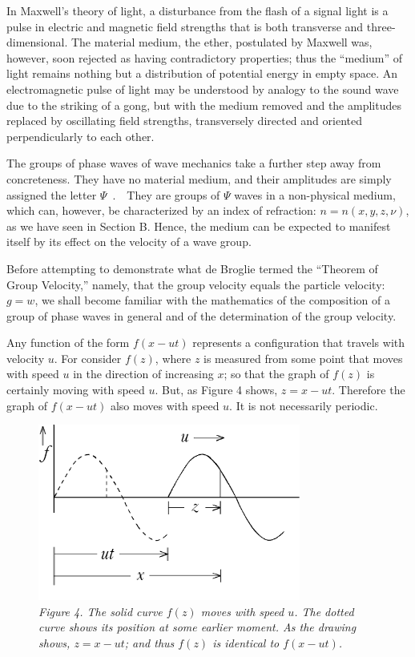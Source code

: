 In Maxwell's theory of light, a disturbance from the flash of a signal
light is a pulse in electric and magnetic field strengths that is both
transverse and three-dimensional. The material medium, the ether,
postulated by Maxwell was, however, soon rejected as having
contradictory properties; thus the ``medium'' of light remains nothing
but a distribution of potential energy in empty space. An
electromagnetic pulse of light may be understood by analogy to the sound
wave due to the striking of a gong, but with the medium removed and the
amplitudes replaced by oscillating field strengths, transversely
directed and oriented perpendicularly to each other.

The groups of phase waves of wave mechanics take a further step away
from concreteness. They have no material medium, and their amplitudes
are simply assigned the letter $\Psi$~.~~They are groups of $\Psi$
waves in a non-physical medium, which can, however, be characterized by
an index of refraction: $n = n(x,y,z,\nu)$, as we have seen in
Section B. Hence, the medium can be expected to manifest itself by its
effect on the velocity of a wave group.

Before attempting to demonstrate what de Broglie termed the ``Theorem of
Group Velocity,'' namely, that the group velocity equals the particle
velocity: $g = w$, we shall become familiar with the
mathematics of the composition of a group of phase waves in general and
of the determination of the group velocity.

Any function of the form $f(x-ut)$ represents a
configuration that travels with velocity $u$. For consider
$f(z)$, where $z$ is measured from some point that
moves with speed $u$ in the direction of increasing $x$; so
that the graph of $f(z)$ is certainly moving with speed
$u$. But, as Figure 4 shows, $z = x-ut$.
Therefore the graph of $f(x-ut)$ also moves with
speed $u$. It is not necessarily periodic.


\begin{figure}[h] %
  \begin{center}
    \captionsetup{width=3.4in}
    \includegraphics[width=3.4in,height=2.28in]{images/08_debroglie/image025.png}
    \caption*{\emph{Figure 4. The solid curve $f(z)$ moves with speed $u$.
    The dotted curve shows its position at some earlier moment. As the
    drawing shows, $z = x - ut$; and thus
    $f(z)$ is identical to $f(x-ut)$.}}
  \end{center}
\end{figure}


